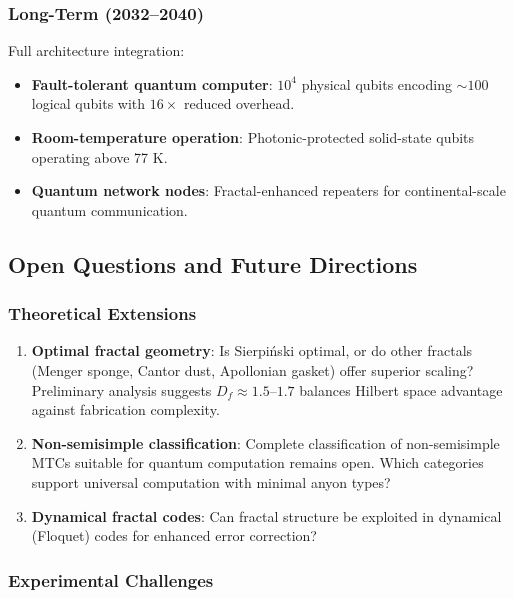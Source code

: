 \subsubsection{Long-Term (2032--2040)}

Full architecture integration:
\begin{itemize}
\item \textbf{Fault-tolerant quantum computer}: $10^4$ physical qubits encoding $\sim 100$ logical qubits with $16\times$ reduced overhead.
\item \textbf{Room-temperature operation}: Photonic-protected solid-state qubits operating above 77 K.
\item \textbf{Quantum network nodes}: Fractal-enhanced repeaters for continental-scale quantum communication.
\end{itemize}

\subsection{Open Questions and Future Directions}

\subsubsection{Theoretical Extensions}

\begin{enumerate}
\item \textbf{Optimal fractal geometry}: Is Sierpi\'{n}ski optimal, or do other fractals (Menger sponge, Cantor dust, Apollonian gasket) offer superior scaling? Preliminary analysis suggests $D_f \approx 1.5$--$1.7$ balances Hilbert space advantage against fabrication complexity.

\item \textbf{Non-semisimple classification}: Complete classification of non-semisimple MTCs suitable for quantum computation remains open. Which categories support universal computation with minimal anyon types?

\item \textbf{Dynamical fractal codes}: Can fractal structure be exploited in dynamical (Floquet) codes for enhanced error correction?
\end{enumerate}

\subsubsection{Experimental Challenges}

